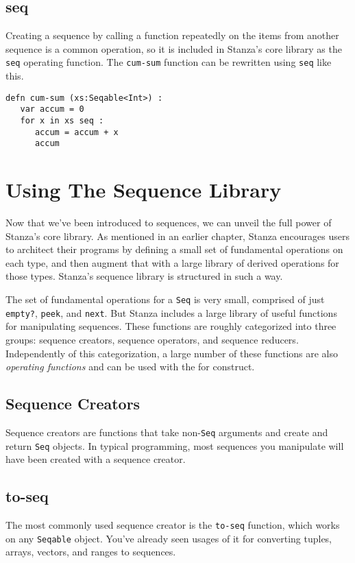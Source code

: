 \documentclass[10pt,oneside]{book}
\begin{document}
\subsection*{seq}
Creating a sequence by calling a function repeatedly on the items from another sequence is a common operation, so it is included in Stanza's core library as the \texttt{\frenchspacing seq} operating function. The \texttt{\frenchspacing cum-sum} function can be rewritten using \texttt{\frenchspacing seq} like this.
\begin{lstlisting}
defn cum-sum (xs:Seqable<Int>) :
   var accum = 0
   for x in xs seq :
      accum = accum + x
      accum
\end{lstlisting}

\section{Using The Sequence Library}
Now that we've been introduced to sequences, we can unveil the full power of Stanza's core library. As mentioned in an earlier chapter, Stanza encourages users to architect their programs by defining a small set of fundamental operations on each type, and then augment that with a large library of derived operations for those types. Stanza's sequence library is structured in such a way.

The set of fundamental operations for a \texttt{\frenchspacing Seq} is very small, comprised of just \texttt{\frenchspacing empty?}, \texttt{\frenchspacing peek}, and \texttt{\frenchspacing next}. But Stanza includes a large library of useful functions for manipulating sequences. These functions are roughly categorized into three groups: sequence creators, sequence operators, and sequence reducers. Independently of this categorization, a large number of these functions are also {\em operating functions} and can be used with the for construct.

\subsection*{Sequence Creators}
Sequence creators are functions that take non-\texttt{\frenchspacing Seq} arguments and create and return \texttt{\frenchspacing Seq} objects. In typical programming, most sequences you manipulate will have been created with a sequence creator.

\subsection*{to-seq}
The most commonly used sequence creator is the \texttt{\frenchspacing to-seq} function, which works on any \texttt{\frenchspacing Seqable} object. You've already seen usages of it for converting tuples, arrays, vectors, and ranges to sequences.
\end{document}
